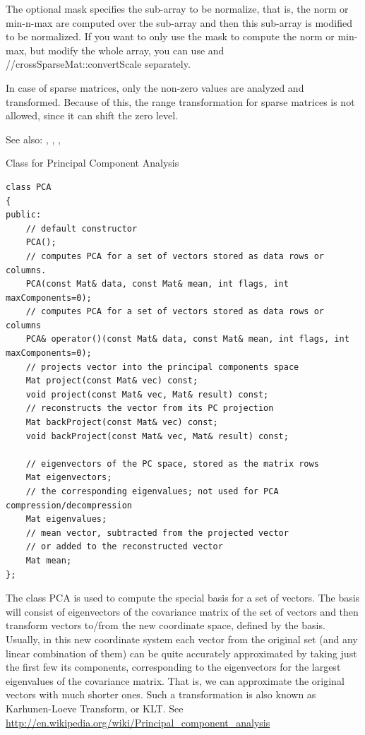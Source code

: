 The optional mask specifies the sub-array to be normalize, that is, the norm or min-n-max are computed over the sub-array and then this sub-array is modified to be normalized. If you want to only use the mask to compute the norm or min-max, but modify the whole array, you can use  and //cross{SparseMat::convertScale} separately.

In case of sparse matrices, only the non-zero values are analyzed and transformed. Because of this, the range transformation for sparse matrices is not allowed, since it can shift the zero level. 

See also: , , , 


\label{PCA}
Class for Principal Component Analysis

\begin{lstlisting}
class PCA
{
public:
    // default constructor
    PCA();
    // computes PCA for a set of vectors stored as data rows or columns.
    PCA(const Mat& data, const Mat& mean, int flags, int maxComponents=0);
    // computes PCA for a set of vectors stored as data rows or columns
    PCA& operator()(const Mat& data, const Mat& mean, int flags, int maxComponents=0);
    // projects vector into the principal components space
    Mat project(const Mat& vec) const;
    void project(const Mat& vec, Mat& result) const;
    // reconstructs the vector from its PC projection
    Mat backProject(const Mat& vec) const;
    void backProject(const Mat& vec, Mat& result) const;

    // eigenvectors of the PC space, stored as the matrix rows
    Mat eigenvectors;
    // the corresponding eigenvalues; not used for PCA compression/decompression
    Mat eigenvalues;
    // mean vector, subtracted from the projected vector
    // or added to the reconstructed vector
    Mat mean;
};
\end{lstlisting}

The class PCA is used to compute the special basis for a set of vectors. The basis will consist of eigenvectors of the covariance matrix of the set of vectors and then transform vectors to/from the new coordinate space, defined by the basis. Usually, in this new coordinate system each vector from the original set (and any linear combination of them) can be quite accurately approximated by taking just the first few its components, corresponding to the eigenvectors for the largest eigenvalues of the covariance matrix. That is, we can approximate the original vectors with much shorter ones. Such a transformation is also known as Karhunen-Loeve Transform, or KLT. See \url{http://en.wikipedia.org/wiki/Principal\_component\_analysis}

